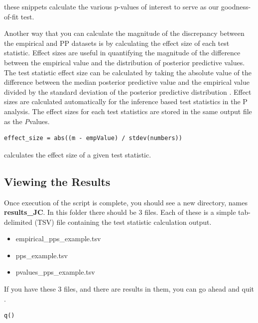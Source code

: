 these snippets calculate the various p-values of interest to serve as our goodness-of-fit test. 


Another way that you can calculate the magnitude of the discrepancy between the empirical and PP datasets is by
calculating the effect size of each test statistic. Effect sizes are useful in quantifying the magnitude of the difference between the 
empirical value and the distribution of posterior predictive values. The test statistic effect size can be calculated by taking the 
absolute value of the difference between the median posterior predictive value and the empirical value divided by 
the standard deviation of the posterior predictive distribution \citep{Doyle2015-qb}. Effect sizes are calculated automatically for the inference based test statistics in the P analysis. The effect sizes for each test statistics are stored in the same output file as the \textit{P}\-values. 

{\tt \begin{Snugshade}[184,207,236]
\begin{lstlisting}
effect_size = abs((m - empValue) / stdev(numbers))
\end{lstlisting}
\end{Snugshade}}


calculates the effect size of a given test statistic. 


\subsection{Viewing the Results}

Once execution of the script is complete, you should see a new directory, names \textbf{results\_JC}. In this folder there should be 3 files. Each of these is a simple tab-delimited (TSV) file containing the test statistic calculation output.

\begin{itemize}
\item empirical\_pps\_example.tsv
\item pps\_example.tsv
\item pvalues\_pps\_example.tsv
\end{itemize}

If you have these 3 files, and there are results in them, you can go ahead and quit \RevBayes.

{\tt \begin{Snugshade}[184,207,236]
\begin{lstlisting}  
q()
\end{lstlisting}
\end{Snugshade}}

